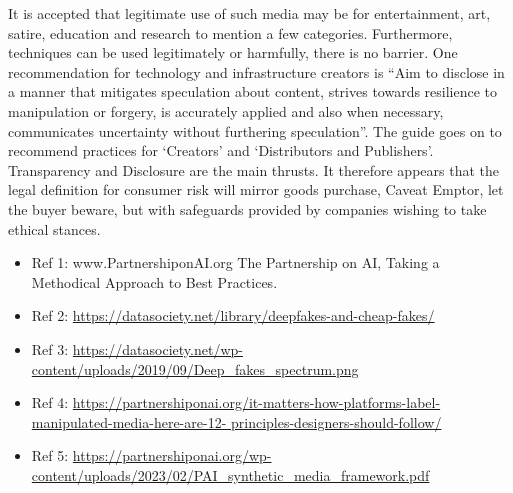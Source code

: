 It is accepted that legitimate use of such media may be for entertainment, art, satire, education and research to mention a few categories. Furthermore, techniques can be used legitimately or harmfully, there is no barrier. One recommendation for technology and infrastructure creators is “Aim to disclose in a manner that mitigates speculation about content, strives towards resilience to manipulation or forgery, is accurately applied and also when necessary, communicates uncertainty without furthering speculation”. The guide goes on to recommend practices for ‘Creators’ and ‘Distributors and Publishers’. Transparency and Disclosure are the main thrusts. It therefore appears that the legal definition for consumer risk will mirror goods purchase, Caveat Emptor, let the buyer beware, but with safeguards provided by companies wishing to take ethical stances.
\begin{itemize}
\item Ref 1: www.PartnershiponAI.org The Partnership on AI, Taking a Methodical Approach to Best Practices.
\item Ref 2: \href{https://datasociety.net/library/deepfakes-and-cheap-fakes/}
  {https://datasociety.net/library/deepfakes-and-cheap-fakes/}
\item Ref 3: \href{https://datasociety.net/wp-content/uploads/2019/09/Deep\_fakes\_spectrum.png}
  {https://datasociety.net/wp-content/uploads/2019/09/Deep\_fakes\_spectrum.png}
\item Ref 4: \href{https://partnershiponai.org/it-matters-how-platforms-label-manipulated-media-here-are-12-principles-designers-should-follow/}
  {https://partnershiponai.org/it-matters-how-platforms-label-manipulated-media-here-are-12- principles-designers-should-follow/}
\item Ref 5: \href{https://partnershiponai.org/wp-content/uploads/2023/02/PAI\_synthetic\_media\_framework.pdf}
  {https://partnershiponai.org/wp-content/uploads/2023/02/PAI\_synthetic\_media\_framework.pdf}
\end{itemize}

